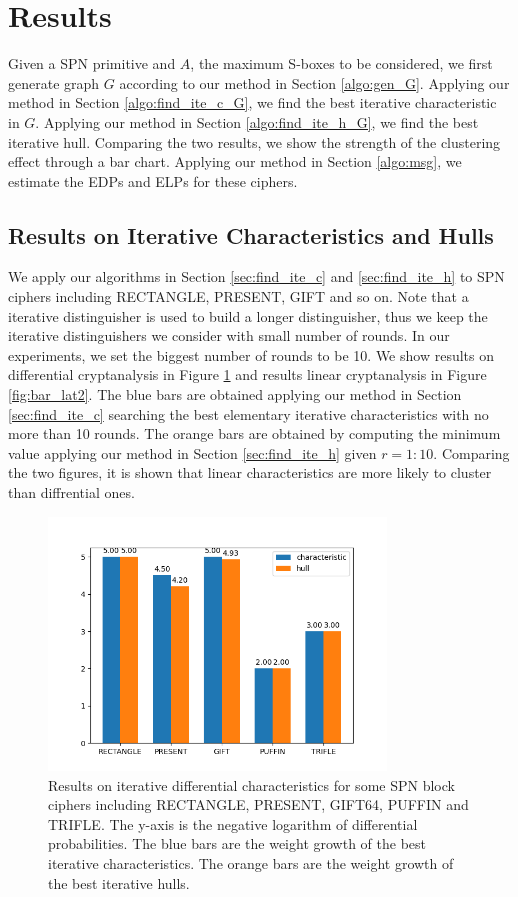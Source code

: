 \section{Results}\label{sec:result}

Given a SPN primitive and $A$, the maximum S-boxes to be considered, we first generate graph $G$ according to our method in Section \ref{algo:gen_G}. Applying our method in Section \ref{algo:find_ite_c_G}, we find the best iterative characteristic in $G$. Applying our method in Section \ref{algo:find_ite_h_G}, we find the best iterative hull. Comparing the two results, we show the strength of the clustering effect through a bar chart. Applying our method in Section \ref{algo:msg}, we estimate the EDPs and ELPs for these ciphers. 

\subsection{Results on Iterative Characteristics and Hulls}

We apply our algorithms in Section \ref{sec:find_ite_c} and \ref{sec:find_ite_h} to SPN ciphers including RECTANGLE, PRESENT, GIFT and so on. Note that a iterative distinguisher is used to build a longer distinguisher, thus we keep the iterative distinguishers we consider with small number of rounds. In our experiments, we set the biggest number of rounds to be 10. We show results on differential cryptanalysis in Figure \ref{fig:bar_ddt} and results linear cryptanalysis in Figure \ref{fig:bar_lat2}. The blue bars are obtained applying our method in Section \ref{sec:find_ite_c} searching the best elementary iterative characteristics with no more than 10 rounds. The orange bars are obtained by computing the minimum value applying our method in Section \ref{sec:find_ite_h} given $r=1:10$. Comparing the two figures, it is shown that linear characteristics are more likely to cluster than diffrential ones. 

\begin{figure}\label{fig:bar_ddt}
    \centering
    \caption{Results on iterative differential characteristics for some SPN block ciphers including RECTANGLE, PRESENT, GIFT64, PUFFIN and TRIFLE. The y-axis is the negative logarithm of differential probabilities. The blue bars are the weight growth of the best iterative characteristics. The orange bars are the weight growth of the best iterative hulls.}
	\includegraphics[width=0.8\textwidth]{fig/bar_ddt.png}
\end{figure}

